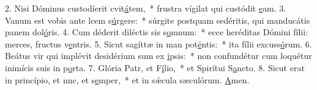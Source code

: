 2. Nisi Dóminus custodíerit cvit\uline{á}tem,~* frustra vígilat qui custódit \uline{e}am.
3. Vanum est vobis ante lcem s\uline{ú}rgere:~* súrgite postquam sedéritis, qui manducátis panem dol\uline{ó}ris.
4. Cum déderit diléctis sis s\uline{o}mnum:~* ecce heréditas Dómini fílii: merces, fructus v\uline{e}ntris.
5. Sicut sagíttæ in man pot\uline{é}ntis:~* ita fílii excuss\uline{ó}rum.
6. Beátus vir qui implévit desidérium sum ex \uline{i}psis:~* non confundétur cum loquétur inimícis suis in p\uline{o}rta.
7. Glória Patr, et F\uline{í}lio,~* et Spirítui S\uline{a}ncto.
8. Sicut erat in princípio, et nnc, et s\uline{e}mper,~* et in sǽcula sæculórum. \uline{A}men.
